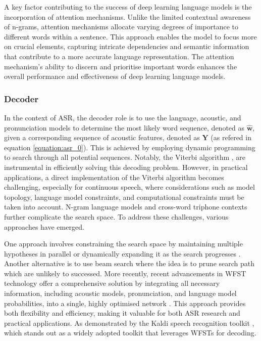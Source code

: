A key factor contributing to the success of deep learning language models is the incorporation of attention mechanisms. Unlike the limited contextual awareness of n-grams, attention mechanisms allocate varying degrees of importance to different words within a sentence. This approach enables the model to focus more on crucial elements, capturing intricate dependencies and semantic information that contribute to a more accurate language representation. The attention mechanism's ability to discern and prioritise important words enhances the overall performance and effectiveness of deep learning language models.


\subsubsection{Decoder}%

In the context of \ac{ASR}, the decoder role is to use the language, acoustic, and pronunciation models to determine the most likely word sequence, denoted as $\boldsymbol{\hat{w}}$, given a corresponding sequence of acoustic features, denoted as $\boldsymbol{Y}$ (as refered in equation \ref{equation:asr_0}). This is achieved by employing dynamic programming to search through all potential sequences. Notably, the Viterbi algorithm \cite{viterbi_decoder}, are instrumental in efficiently solving this decoding problem. However, in practical applications, a direct implementation of the Viterbi algorithm becomes challenging, especially for continuous speech, where considerations such as model topology, language model constraints, and computational constraints must be taken into account. N-gram language models and cross-word triphone contexts further complicate the search space. To address these challenges, various approaches have emerged. 

One approach involves constraining the search space by maintaining multiple hypotheses in parallel \cite{valtchev1994novel} or dynamically expanding it as the search progresses \cite{aubert1995large}. Another alternative is to use beam search where the idea is to prune search path which are unlikely to successed. More recently, recent advancements in \ac{WFST} technology offer a comprehensive solution by integrating all necessary information, including acoustic models, pronunciation, and language model probabilities, into a single, highly optimised network \cite{mohri1997finite,caseiro2002using}. This approach provides both flexibility and efficiency, making it valuable for both \ac{ASR} research and practical applications. As demonstrated by the Kaldi speech recognition toolkit \cite{kaldi}, which  stands out as a widely adopted toolkit that leverages \acp{WFST} for decoding. 

